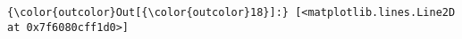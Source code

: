 \documentclass[11pt]{article}
\begin{document}
\begin{Verbatim}[commandchars=\\\{\}]
{\color{outcolor}Out[{\color{outcolor}18}]:} [<matplotlib.lines.Line2D at 0x7f6080cff1d0>]
\end{Verbatim}
            
    \begin{center}
    \end{center}
    { \hspace*{\fill} \\}
    

    
    
    
    
\end{document}
